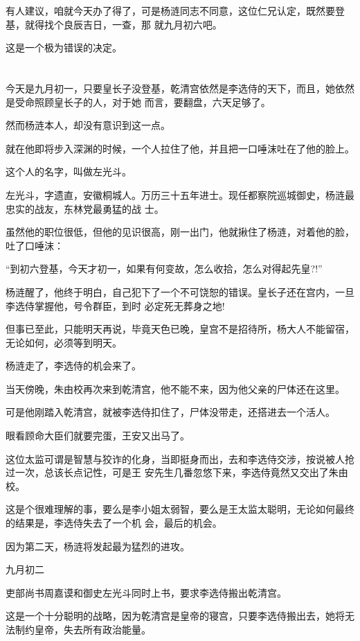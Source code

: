 \documentclass[11pt,a4paper,onecolumn]{article}
\begin{document}
有人建议，咱就今天办了得了，可是杨涟同志不同意，这位仁兄认定，既然要登基，就得找个良辰吉日，一查，那
就九月初六吧。

这是一个极为错误的决定。

\section[\thesection]{}

今天是九月初一，只要皇长子没登基，乾清宫依然是李选侍的天下，而且，她依然是受命照顾皇长子的人，对于她
而言，要翻盘，六天足够了。

然而杨涟本人，却没有意识到这一点。

就在他即将步入深渊的时候，一个人拉住了他，并且把一口唾沫吐在了他的脸上。

这个人的名字，叫做左光斗。

左光斗，字遗直，安徽桐城人。万历三十五年进士。现任都察院巡城御史，杨涟最忠实的战友，东林党最勇猛的战
士。

虽然他的职位很低，但他的见识很高，刚一出门，他就揪住了杨涟，对着他的脸，吐了口唾沫：

``到初六登基，今天才初一，如果有何变故，怎么收拾，怎么对得起先皇?!''

杨涟醒了，他终于明白，自己犯下了一个不可饶恕的错误。皇长子还在宫内，一旦李选侍掌握他，号令群臣，到时
必定死无葬身之地!

但事已至此，只能明天再说，毕竟天色已晚，皇宫不是招待所，杨大人不能留宿，无论如何，必须等到明天。

杨涟走了，李选侍的机会来了。

当天傍晚，朱由校再次来到乾清宫，他不能不来，因为他父亲的尸体还在这里。

可是他刚踏入乾清宫，就被李选侍扣住了，尸体没带走，还搭进去一个活人。

眼看顾命大臣们就要完蛋，王安又出马了。

这位太监可谓是智慧与狡诈的化身，当即挺身而出，去和李选侍交涉，按说被人抢过一次，总该长点记性，可是王
安先生几番忽悠下来，李选侍竟然又交出了朱由校。

这是个很难理解的事，要么是李小姐太弱智，要么是王太监太聪明，无论如何最终的结果是，李选侍失去了一个机
会，最后的机会。

因为第二天，杨涟将发起最为猛烈的进攻。

九月初二

吏部尚书周嘉谟和御史左光斗同时上书，要求李选侍搬出乾清宫。

这是一个十分聪明的战略，因为乾清宫是皇帝的寝宫，只要李选侍搬出去，她将无法制约皇帝，失去所有政治能量。
\end{document}
